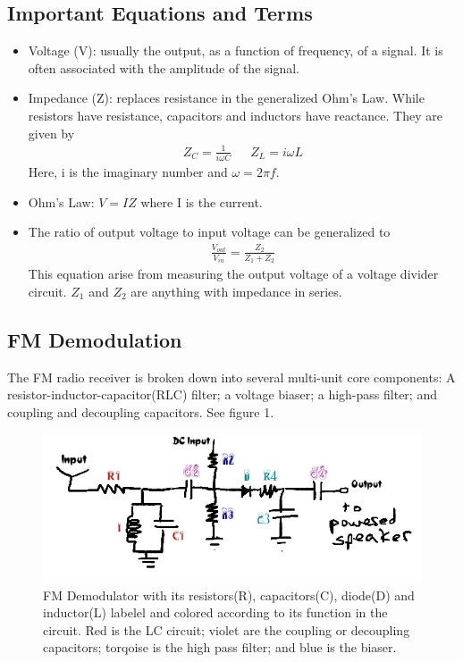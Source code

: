 \documentclass[12pt]{article}
\begin{document}
\subsection{Important Equations and Terms}
\begin{itemize}
\item Voltage (V): usually the output, as a function of frequency, of a
  signal. It is often associated with the amplitude of the signal.
\item Impedance (Z): replaces resistance in the generalized Ohm's Law. While
  resistors have resistance, capacitors and inductors have
  reactance. They are given by
\begin{align}Z_{C} = \frac{1}{i\omega{C}}\,\,\,\,\,\,\,\,\, Z_{L} =
  i\omega{L}\end{align}
Here, i is the imaginary number and $\omega = 2\pi{f}$.
\item Ohm's Law: $V = IZ$ where I is the current.
\item The ratio of output voltage to input voltage can be generalized to
\begin{align}\frac{V_{out}}{V_{in}} = \frac{Z_{2}}{Z_{1} +
    Z_{2}}\end{align}
This equation arise from measuring the output voltage of a voltage
divider circuit.  $Z_{1}$ and $Z_{2}$ are anything with impedance in series.
\end{itemize}

\subsection{FM Demodulation}
The FM radio receiver is broken down into several multi-unit
core components: A resistor-inductor-capacitor(RLC) filter; a voltage
biaser; a high-pass filter; and coupling and decoupling capacitors. See
figure 1.
\begin{figure}[H]
\centering
\includegraphics[width=.9\textwidth]{fm_demodulation.png}
\caption{FM Demodulator with its resistors(R), capacitors(C), diode(D) and
  inductor(L) labelel and colored according to its function in
  the circuit. Red is the LC circuit; violet are the coupling or
  decoupling capacitors; torqoise is the high pass filter; and blue is
  the biaser.}
\end{figure}
\end{document}
